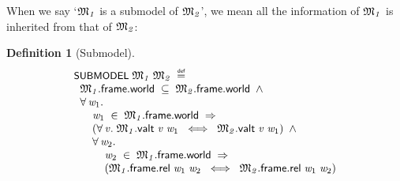 \documentclass[letterpaper]{article}
\newtheorem{defn}{Definition}
\renewcommand{\HOLConst}[1]{{\textsf{\upshape\small #1}}}
\renewcommand{\HOLinline}[1]{\ensuremath{#1}}
\newenvironment{holmath}{\begin{displaymath}\begin{array}{l}}{\end{array}\end{displaymath}\ignorespacesafterend}
\begin{document}
When we say `\HOLinline{\HOLFreeVar{\ensuremath{\mathfrak{M}\sb{1}}}} is a submodel of \HOLinline{\HOLFreeVar{\ensuremath{\mathfrak{M}\sb{2}}}}', we mean all the information of \HOLinline{\HOLFreeVar{\ensuremath{\mathfrak{M}\sb{1}}}} is inherited from that of \HOLinline{\HOLFreeVar{\ensuremath{\mathfrak{M}\sb{2}}}}:
\begin{defn}[Submodel]
\begin{holmath}
  \HOLConst{SUBMODEL}\;\HOLFreeVar{\ensuremath{\mathfrak{M}\sb{1}}}\;\HOLFreeVar{\ensuremath{\mathfrak{M}\sb{2}}}\;\HOLSymConst{\HOLTokenDefEquality{}}\\
\;\;\HOLFreeVar{\ensuremath{\mathfrak{M}\sb{1}}}.\HOLFieldName{frame}.\HOLFieldName{world}\;\HOLSymConst{\HOLTokenSubset{}}\;\HOLFreeVar{\ensuremath{\mathfrak{M}\sb{2}}}.\HOLFieldName{frame}.\HOLFieldName{world}\;\HOLSymConst{\HOLTokenConj{}}\\
\;\;\HOLSymConst{\HOLTokenForall{}}\HOLBoundVar{w\sb{\mathrm{1}}}.\\
\;\;\;\;\;\;\HOLBoundVar{w\sb{\mathrm{1}}}\;\HOLSymConst{\HOLTokenIn{}}\;\HOLFreeVar{\ensuremath{\mathfrak{M}\sb{1}}}.\HOLFieldName{frame}.\HOLFieldName{world}\;\HOLSymConst{\HOLTokenImp{}}\\
\;\;\;\;\;\;(\HOLSymConst{\HOLTokenForall{}}\HOLBoundVar{v}.\;\HOLFreeVar{\ensuremath{\mathfrak{M}\sb{1}}}.\HOLFieldName{valt}\;\HOLBoundVar{v}\;\HOLBoundVar{w\sb{\mathrm{1}}}\;\HOLSymConst{\HOLTokenEquiv{}}\;\HOLFreeVar{\ensuremath{\mathfrak{M}\sb{2}}}.\HOLFieldName{valt}\;\HOLBoundVar{v}\;\HOLBoundVar{w\sb{\mathrm{1}}})\;\HOLSymConst{\HOLTokenConj{}}\\
\;\;\;\;\;\;\HOLSymConst{\HOLTokenForall{}}\HOLBoundVar{w\sb{\mathrm{2}}}.\\
\;\;\;\;\;\;\;\;\;\;\HOLBoundVar{w\sb{\mathrm{2}}}\;\HOLSymConst{\HOLTokenIn{}}\;\HOLFreeVar{\ensuremath{\mathfrak{M}\sb{1}}}.\HOLFieldName{frame}.\HOLFieldName{world}\;\HOLSymConst{\HOLTokenImp{}}\\
\;\;\;\;\;\;\;\;\;\;(\HOLFreeVar{\ensuremath{\mathfrak{M}\sb{1}}}.\HOLFieldName{frame}.\HOLFieldName{rel}\;\HOLBoundVar{w\sb{\mathrm{1}}}\;\HOLBoundVar{w\sb{\mathrm{2}}}\;\HOLSymConst{\HOLTokenEquiv{}}\;\HOLFreeVar{\ensuremath{\mathfrak{M}\sb{2}}}.\HOLFieldName{frame}.\HOLFieldName{rel}\;\HOLBoundVar{w\sb{\mathrm{1}}}\;\HOLBoundVar{w\sb{\mathrm{2}}})
\end{holmath}
\end{defn}
\end{document}
